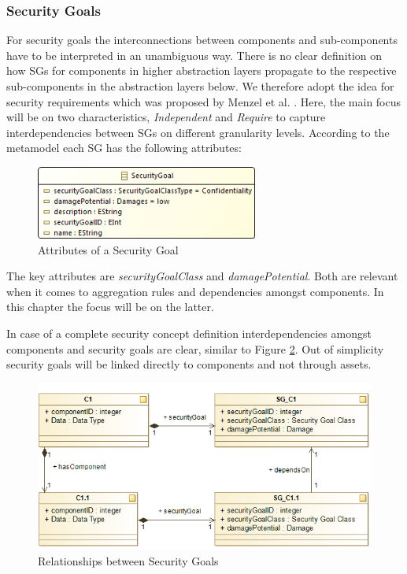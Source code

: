\subsubsection*{Security Goals}
\label{subsubsec:sec_goal}
For security goals the interconnections between components and sub-components have to be interpreted in an unambiguous way. There is no clear definition on how SGs for components in higher abstraction layers propagate to the respective sub-components in the abstraction layers below. We therefore adopt the idea for security requirements which was proposed by Menzel et al. \cite{Menzel2008}. Here, the main focus will be on two characteristics, \textit{Independent} and \textit{Require} to capture interdependencies between SGs on different granularity levels. According to the metamodel each SG has the following attributes:

\begin{figure}[H]
\centering
\includegraphics[width=0.65\textwidth]{pictures/securitygoal.png}
\caption{Attributes of a Security Goal}
\label{fig:security_goal}
\end{figure} 

The key attributes are \textit{securityGoalClass} and \textit{damagePotential}. Both are relevant when it comes to aggregation rules and dependencies amongst components. In this chapter the focus will be on the latter.

In case of a complete security concept definition interdependencies amongst components and security goals are clear, similar to Figure \ref{fig:subcomponent}. Out of simplicity security goals will be linked directly to components and not through assets.

\begin{figure}[H]
\centering
\includegraphics[scale=0.75]{pictures/rel_component.png}
\caption{Relationships between Security Goals}
\label{fig:subcomponent}
\end{figure} 

